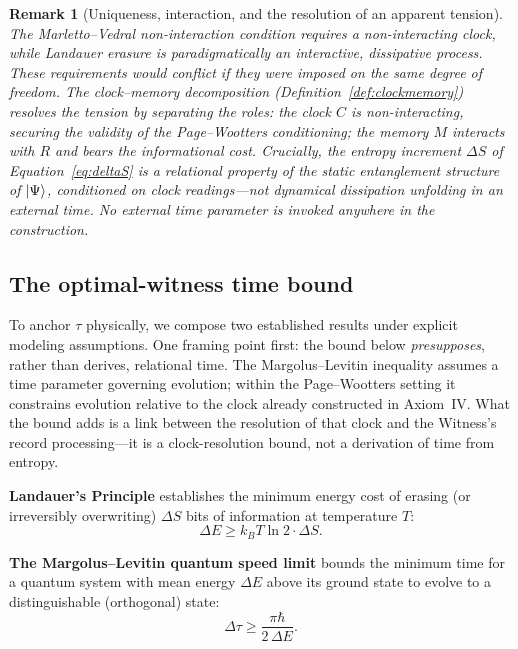 \documentclass[11pt, a4paper]{article}
\newtheorem{remark}{Remark}
\begin{document}
\begin{remark}[Uniqueness, interaction, and the resolution of an apparent tension]
\label{rem:tension}
The Marletto--Vedral non-interaction condition \cite{Marletto2017} requires a non-interacting clock, while Landauer erasure is paradigmatically an interactive, dissipative process. These requirements would conflict if they were imposed on the same degree of freedom. The clock--memory decomposition (Definition~\ref{def:clockmemory}) resolves the tension by separating the roles: the clock $C$ is non-interacting, securing the validity of the Page--Wootters conditioning; the memory $M$ interacts with $R$ and bears the informational cost. Crucially, the entropy increment $\Delta S$ of Equation~\eqref{eq:deltaS} is a relational property of the static entanglement structure of $\ket{\Psi}$, conditioned on clock readings---not dynamical dissipation unfolding in an external time. No external time parameter is invoked anywhere in the construction.
\end{remark}

\subsection{The optimal-witness time bound}
\label{sec:bound}

To anchor $\tau$ physically, we compose two established results under explicit modeling assumptions. One framing point first: the bound below \emph{presupposes}, rather than derives, relational time. The Margolus--Levitin inequality assumes a time parameter governing evolution; within the Page--Wootters setting it constrains evolution relative to the clock already constructed in Axiom~IV. What the bound adds is a link between the resolution of that clock and the Witness's record processing---it is a clock-resolution bound, not a derivation of time from entropy.

\medskip
\noindent\textbf{Landauer's Principle} \cite{Landauer1961} establishes the minimum energy cost of erasing (or irreversibly overwriting) $\Delta S$ bits of information at temperature $T$:
\begin{equation}
\Delta E \geq k_B T \ln 2 \cdot \Delta S.
\label{eq:Landauer}
\end{equation}

\noindent\textbf{The Margolus--Levitin quantum speed limit} \cite{Margolus1998} bounds the minimum time for a quantum system with mean energy $\Delta E$ above its ground state to evolve to a distinguishable (orthogonal) state:
\begin{equation}
\Delta\tau \geq \frac{\pi\hbar}{2\,\Delta E}.
\label{eq:ML}
\end{equation}
\end{document}
